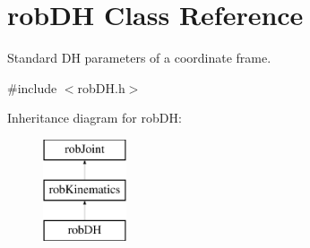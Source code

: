 \hypertarget{classrob_d_h}{\section{rob\-D\-H Class Reference}
\label{classrob_d_h}
}


Standard D\-H parameters of a coordinate frame.  




{\ttfamily \#include $<$rob\-D\-H.\-h$>$}

Inheritance diagram for rob\-D\-H\-:\begin{figure}[H]
\begin{center}
\leavevmode
\includegraphics[height=3.000000cm]{d3/d51/classrob_d_h}
\end{center}
\end{figure}
